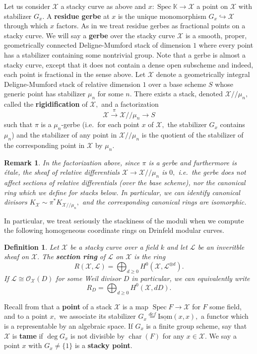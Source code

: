 \documentclass[11pt]{amsart}
\newtheorem{definition}[theorem]{Definition}
\newtheorem{remark}[theorem]{Remark}
\theoremstyle{definition}
\numberwithin{equation}{section}
\newcommand{\Isom}{\mathrm{Isom}} 	%
\newcommand{\Spec}{\operatorname{Spec}} 	%
\newcommand{\cO}{\mathcal{O}}		%
\newcommand{\sL}{\mathscr{L}}		%
\newcommand{\sX}{\mathscr{X}}		%
\newcommand{\bbK}{\mathbb{K}}		%
\begin{document}
		Let us consider $\sX$ a stacky curve as above and $x:\Spec \bbK\to\sX$ a point on $\sX$ with stabilizer $G_x.$ A \textbf{residue gerbe} at $x$ is the unique monomorphism $G_x\hookrightarrow \sX$ through which $x$ factors. As in \cite{VZB} we treat residue gerbes as fractional points on a stacky curve. We will say a \textbf{gerbe} over the stacky curve $\sX$ is a smooth, proper, geometrically connected Deligne-Mumford stack of dimension $1$ where every point has a stabilizer containing some nontrivial group. Note that a gerbe is almost a stacky curve, except that it does not contain a dense open subscheme and indeed, each point is fractional in the sense above. Let $\sX$ denote a geometrically integral Deligne-Mumford stack of relative dimension $1$ over a base scheme $S$ whose generic point has stabilizer $\mu_n$ for some $n.$ There exists a stack, denoted $\sX/\!/\mu_n,$ called the \textbf{rigidification} of $\sX,$ and a factorization 
		\[\sX\overset{\pi}{\to}\sX/\!/\mu_n\to S\] 
		such that $\pi$ is a $\mu_n$-gerbe (i.e.\ for each point $x$ of $\sX,$ the stabilizer $G_x$ contains $\mu_n$) and the stabilizer of any point in $\sX/\!/\mu_n$ is the quotient of the stabilizer of the corresponding point in $\sX$ by $\mu_n.$
		
		\begin{remark}
			In the factorization above, since $\pi$ is a gerbe and furthermore is \'etale, the sheaf of relative differentials $\sX\to \sX/\!/\mu_n$ is $0,$ i.e.\ the gerbe does not affect sections of relative differentials (over the base scheme), nor the canonical ring which we define for stacks below. In particular, we can identify canonical divisors $K_{\sX}\sim \pi^*K_{\sX/\!/\mu_n},$ and the corresponding canonical rings are isomorphic. 
		\end{remark}
		
		In particular, we treat seriously the stackiness of the moduli when we compute the following homogeneous coordinate rings on Drinfeld modular curves.  
		\begin{definition}
			Let $\sX$ be a stacky curve over a field $k$ and let $\sL$ be an inveritble sheaf on $\sX.$ The \textbf{section ring} of $\sL$ on $\sX$ is the ring 
			\[R(\sX,\sL)=\bigoplus_{d\geq 0}H^0(\sX,\sL^{\otimes d}).\]
			If $\sL\cong \cO_{\sX}(D)$ for some Weil divisor $D$ in particular, we can equivalently write 
			\[R_D=\bigoplus_{d\geq 0}H^0(\sX,dD).
			\]
		\end{definition}		
		
		Recall from \cite[Chapter $5.1$]{VZB} that a \textbf{point} of a stack $\sX$ is a map $\Spec F\to \sX$ for $F$ some field, and to a point $x,$ we associate its stabilizer $G_x\overset{def}{=}\underline{\Isom}(x,x),$ a functor which is a representable by an algebraic space. If $G_x$ is a finite group scheme, say that $\sX$ is \textbf{tame} if $\deg G_x$ is not divisible by $\operatorname{char}(F)$ for any $x\in \sX.$ We say a point $x$ with $G_x\neq \{1\}$ is a \textbf{stacky point}.\\
		
\end{document}
